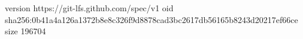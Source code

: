 version https://git-lfs.github.com/spec/v1
oid sha256:0b41a4a126a1372b8e8c326f9d8878cad3bc2617db56165b8243d20217ef66ce
size 196704
